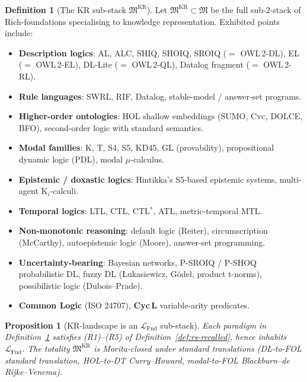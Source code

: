 \documentclass[11pt, a4paper]{article}
\newtheorem{proposition}[theorem]{Proposition}
\theoremstyle{definition}
\newtheorem{definition}[theorem]{Definition}
\theoremstyle{remark}
\newcommand{\fM}{\mathfrak{M}}
\newcommand{\LFnd}{\mathcal{L}_{\mathrm{Fnd}}}
\newcommand{\OWL}{\textsc{OWL\,2}}
\newcommand{\SUMO}{\textsc{SUMO}}
\newcommand{\Cyc}{\textsc{Cyc}}
\newcommand{\DOLCE}{\textsc{DOLCE}}
\newcommand{\BFO}{\textsc{BFO}}
\newcommand{\SWRL}{\textsc{SWRL}}
\begin{document}
\begin{definition}[The KR sub-stack $\fM^{\mathrm{KR}}$]
\label{def:kr-substack}
Let $\fM^{\mathrm{KR}} \subset \fM$ be the full sub-$2$-stack of Rich-foundations specialising to knowledge representation. Exhibited points include:
\begin{itemize}[nosep]
\item \textbf{Description logics}: \textsf{AL}, \textsf{ALC}, \textsf{SHIQ}, \textsf{SHOIQ}, \textsf{SROIQ} ($=$ \OWL-\textsc{DL}), \textsf{EL} ($=$ \OWL-\textsc{EL}), \textsf{DL-Lite} ($=$ \OWL-\textsc{QL}), Datalog fragment ($=$ \OWL-\textsc{RL}).
\item \textbf{Rule languages}: \SWRL, RIF, Datalog, stable-model / answer-set programs.
\item \textbf{Higher-order ontologies}: HOL shallow embeddings (\SUMO, \Cyc, \DOLCE, \BFO), second-order logic with standard semantics.
\item \textbf{Modal families}: K, T, S4, S5, KD45, GL (provability), propositional dynamic logic (PDL), modal $\mu$-calculus.
\item \textbf{Epistemic / doxastic logics}: Hintikka's S5-based epistemic systems, multi-agent $\mathrm{K}_i$-calculi.
\item \textbf{Temporal logics}: LTL, CTL, CTL$^{\ast}$, ATL, metric-temporal MTL.
\item \textbf{Non-monotonic reasoning}: default logic (Reiter), circumscription (McCarthy), autoepistemic logic (Moore), answer-set programming.
\item \textbf{Uncertainty-bearing}: Bayesian networks, P-\textsf{SROIQ} / P-\textsf{SHOQ} probabilistic DL, fuzzy DL (Łukasiewicz, Gödel, product t-norms), possibilistic logic (Dubois--Prade).
\item \textbf{Common Logic} (ISO 24707), \textbf{Cyc\,L} variable-arity predicates.
\end{itemize}
\end{definition}

\begin{proposition}[KR-landscape is an $\LFnd$ sub-stack]
\label{prop:kr-landscape}
Each paradigm in Definition~\ref{def:kr-substack} satisfies (R1)--(R5) of Definition~\ref{def:rs-recalled}, hence inhabits $\LFnd$. The totality $\fM^{\mathrm{KR}}$ is Morita-closed under standard translations (DL-to-FOL standard translation, HOL-to-DT Curry--Howard, modal-to-FOL Blackburn--de\,Rijke--Venema).
\end{proposition}
\end{document}
